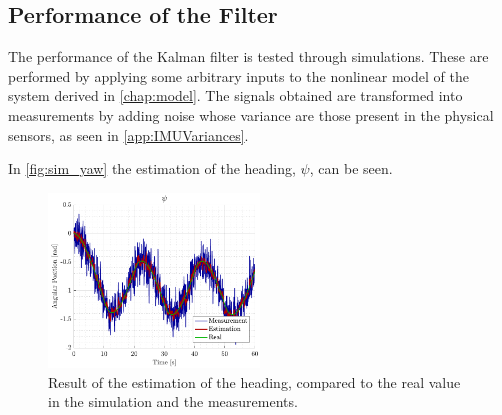 \subsection{Performance of the Filter}
The performance of the Kalman filter is tested through simulations. These are performed by applying some arbitrary inputs to the nonlinear model of the system derived in \autoref{chap:model}. The signals obtained are transformed into measurements by adding noise whose variance are those present in the physical sensors, as seen in \autoref{app:IMUVariances}. 

In \autoref{fig:sim_yaw} the estimation of the heading, $\psi$, can be seen.
\begin{figure}[H]
    \includegraphics[width=0.5\textwidth]{figures/sim_yaw}
    \caption{Result of the estimation of the heading, compared to the real value in the simulation and the measurements.}
    \label{fig:sim_yaw}
\end{figure}


